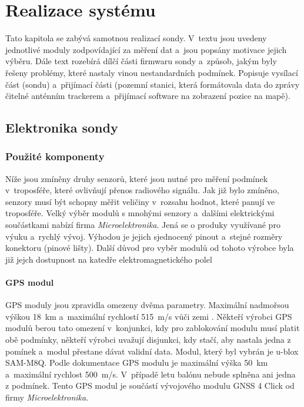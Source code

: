 \documentclass[twoside]{ctuthesis}
\theoremstyle{plain}
\theoremstyle{definition}
\theoremstyle{note}
\begin{document}
\chapter{Realizace systému}
Tato kapitola se zabývá samotnou realizací sondy. V~textu jsou uvedeny jednotlivé moduly zodpovídající za měření dat a~jsou popsány motivace jejich výběru. Dále text rozebírá dílčí části firmwaru sondy a~způsob, jakým byly řešeny problémy, které nastaly vinou nestandardních podmínek. Popisuje vysílací část (sondu) a~přijímací části (pozemní stanici, která formátovala data do zprávy čitelné anténním trackerem a~přijímací software na zobrazení pozice na mapě). 

	\section{Elektronika sondy}

		\subsection{Použité komponenty}
		Níže jsou zmíněny druhy senzorů, které jsou nutné pro měření podmínek v~troposféře, které ovlivňují přenos radiového signálu. Jak již bylo zmíněno, senzory musí být schopny měřit veličiny v~rozsahu hodnot, které panují ve troposféře. Velký výběr modulů s mnohými senzory a~dalšími elektrickými součástkami nabízí firma \textit{Microelektronika}. Jená se o produky využívané pro výuku a~rychlý vývoj. Výhodou je jejich sjednocený pinout a~stejné rozměry konektoru (pinové lišty). Další důvod pro vyběr modulů od tohoto výrobce byla již jejch dostupnost na katedře elektromagnetického polel

			\subsubsection{GPS modul}
			GPS moduly jsou zpravidla omezeny dvěma parametry. Maximální nadmořsou výškou 18~km a~maximální rychlostí 515~m/s vůči zemi . Někteří výrobci GPS modulů berou tato omezení v~konjunkci, kdy pro zablokování modulu musí platit obě podmínky, někteří výrobci uvažují  disjunkci, kdy stačí, aby nastala jedna z pomínek a~modul přestane dávat validní data. Modul, který byl vybrán je u-blox SAM-M8Q. Podle dokumentace GPS modulu \cite{dsh_gps} je maximální výška 50~km a~maximální rychlost 500~m/s. V~případě letu balónu nebude splněna ani jedna z podmínek. Tento GPS modul je součástí vývojového modulu GNSS 4 Click od firmy \textit{Microelektronika}.
\end{document}
